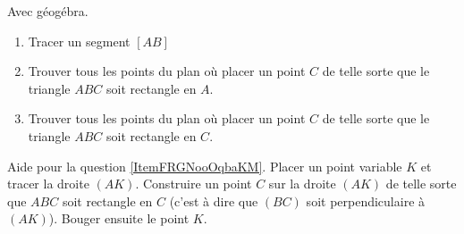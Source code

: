 
\begin{exercice}\label{exo2smath-0231}

    Avec géogébra. 
    \begin{enumerate}
        \item
            Tracer un segment \( [AB]\)
        \item
            Trouver tous les points du plan où placer un point \( C\) de telle sorte que le triangle \( ABC\) soit rectangle en \( A\).
        \item   \label{ItemFRGNooOqbaKM}
            Trouver tous les points du plan où placer un point \( C\) de telle sorte que le triangle \( ABC\) soit rectangle en \( C\).
    \end{enumerate}
    Aide pour la question \ref{ItemFRGNooOqbaKM}. Placer un point variable \( K\) et tracer la droite \( (AK)\). Construire un point \( C\) sur la droite \( (AK)\) de telle sorte que \( ABC\) soit rectangle en $C$ (c'est à dire que \( (BC)\) soit perpendiculaire à \( (AK)\)). Bouger ensuite le point \( K\).

\end{exercice}
